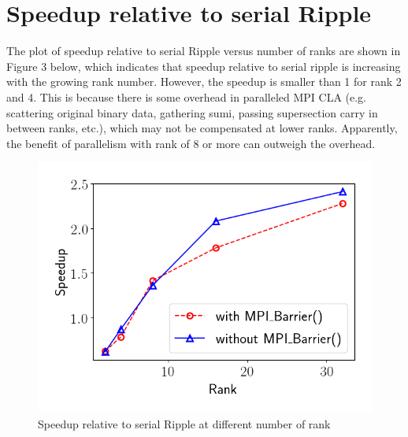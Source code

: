 \documentclass{article}
\begin{document}
\section{Speedup relative to serial Ripple}
The plot of speedup relative to serial Ripple versus number of ranks are shown in Figure 3 below, which indicates that speedup relative to serial ripple is increasing with the growing rank number. However, the speedup is smaller than 1 for rank 2 and 4. This is because there is some overhead in paralleled MPI CLA (e.g. scattering original binary data, gathering sumi, passing supersection carry in between ranks, etc.), which may not be compensated at lower ranks. Apparently, the benefit of parallelism with rank of 8 or more can outweigh the overhead.
\begin{figure}[!htb]
	\centering
	\includegraphics[scale=0.5]{../plot/speedup_rel_serial_ripple.png}
	\caption{Speedup relative to serial Ripple at different number of rank}
\end{figure}
\end{document}
